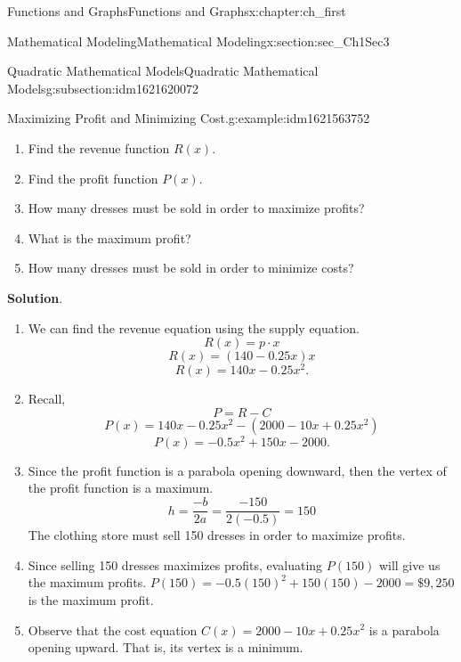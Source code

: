 \documentclass[oneside,10pt,]{book}
\newcommand{\blocktitlefont}{\relax}
\numberwithin{equation}{section}
\begin{document}
\begin{chapterptx}{Functions and Graphs}{}{Functions and Graphs}{}{}{x:chapter:ch_first}
\begin{sectionptx}{Mathematical Modeling}{}{Mathematical Modeling}{}{}{x:section:sec_Ch1Sec3}
\begin{subsectionptx}{Quadratic Mathematical Models}{}{Quadratic Mathematical Models}{}{}{g:subsection:idm1621620072}
\begin{example}{Maximizing Profit and Minimizing Cost.}{g:example:idm1621563752}
%
\begin{enumerate}
\item{}Find the revenue function \(R(x)\).%
\item{}Find the profit function \(P(x)\).%
\item{}How many dresses must be sold in order to maximize profits?%
\item{}What is the maximum profit?%
\item{}How many dresses must be sold in order to minimize costs?%
\end{enumerate}
\par\smallskip%
\noindent\textbf{\blocktitlefont Solution}.\hypertarget{g:solution:idm1621559400}{}\quad{}%
\begin{enumerate}
\item{}We can find the revenue equation using the supply equation.%
\begin{equation*}
R(x)=p\cdot x
\end{equation*}
%
\begin{equation*}
R(x)=(140-0.25x)x
\end{equation*}
%
\begin{equation*}
R(x)=140x-0.25x^2\text{.}
\end{equation*}
%
\item{}Recall,%
\begin{equation*}
P=R-C
\end{equation*}
%
\begin{equation*}
P(x)=140x-0.25x^2-(2000-10x+0.25x^2)
\end{equation*}
%
\begin{equation*}
P(x)=-0.5x^2+150x-2000\text{.}
\end{equation*}
%
\item{}Since the profit function is a parabola opening downward, then the vertex of the profit function is a maximum.%
\begin{equation*}
h=\frac{-b}{2a}=\frac{-150}{2(-0.5)}=150
\end{equation*}
The clothing store must sell 150 dresses in order to maximize profits.%
\item{}Since selling 150 dresses maximizes profits, evaluating \(P(150)\) will give us the maximum profits. \(P(150)=-0.5(150)^2+150(150)-2000=\$ 9,250\) is the maximum profit.%
\item{}Observe that the cost equation \(C(x)=2000-10x+0.25x^2\) is a parabola opening upward. That is, its vertex is a minimum.%
\begin{equation*}

\end{equation*}
\end{enumerate}
\end{example}
\end{subsectionptx}
\end{sectionptx}
\end{chapterptx}
\end{document}

